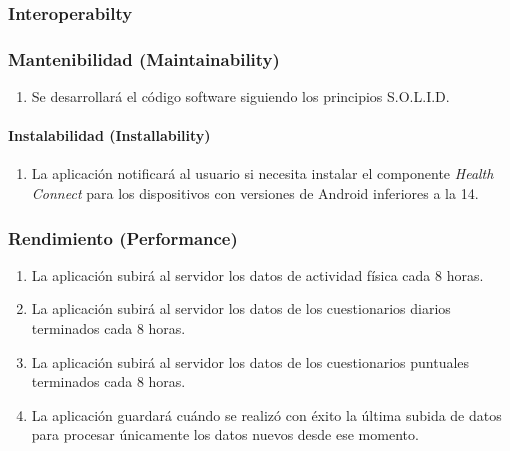         \subsubsection{Interoperabilty}
        \subsubsection{Mantenibilidad (Maintainability)}
            \begin{enumerate}[resume, label=\textbf{\texttt{RNF-\arabic*}}]
                \item \label{req:no_funcionales:solid} Se desarrollará el código software siguiendo los principios S.O.L.I.D.
            \end{enumerate}
            \paragraph{Instalabilidad (Installability)}
                \begin{enumerate}[resume, label=\textbf{\texttt{RNF-\arabic*}}]
                    \item \label{req:no_funcionales:notificacion_salud_conectada} La aplicación notificará al usuario si necesita instalar el componente \textit{Health Connect} para los dispositivos con versiones de Android inferiores a la 14.
                \end{enumerate}
        \subsubsection{Rendimiento (Performance)}
            \begin{enumerate}[resume, label=\textbf{\texttt{RNF-\arabic*}}]
                \item \label{req:no_funcionales:frecuencia_subida_fisica} La aplicación subirá al servidor los datos de actividad física cada 8 horas.
                \item \label{req:no_funcionales:frecuencia_subida_diarios} La aplicación subirá al servidor los datos de los cuestionarios diarios terminados cada 8 horas.
                \item \label{req:no_funcionales:frecuencia_subida_puntuales} La aplicación subirá al servidor los datos de los cuestionarios puntuales terminados cada 8 horas.
                \item \label{req:no_funcionales:guardar_ultima_subida} La aplicación guardará cuándo se realizó con éxito la última subida de datos para procesar únicamente los datos nuevos desde ese momento.
            \end{enumerate}
